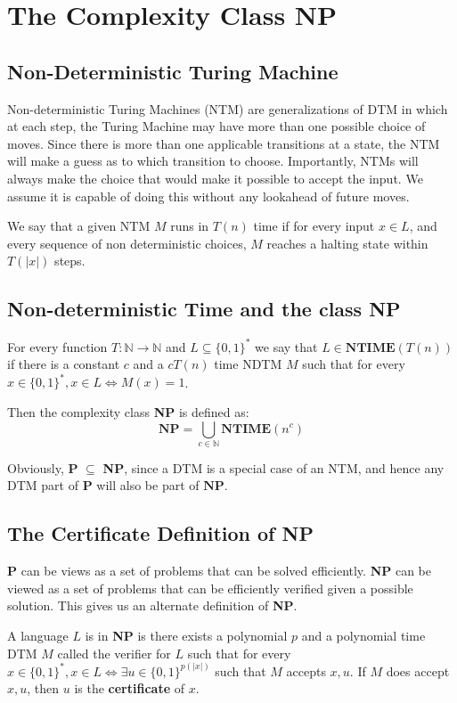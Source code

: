 \documentclass[12pt,letterpaper]{article}
\theoremstyle{definition}
\newcommand{\N}{\mathbb{N}}
\begin{document}
\section{The Complexity Class NP}

\subsection{Non-Deterministic Turing Machine}

Non-deterministic Turing Machines (NTM) are generalizations of DTM in which at each step, the Turing Machine may have more than one possible choice of moves. Since there is more than one applicable transitions at a state, the NTM will make a guess as to which transition to choose. Importantly, NTMs will always make the choice that would make it possible to accept the input. We assume it is capable of doing this without any lookahead of future moves.

We say that a given NTM $M$ runs in $T(n)$ time if for every input $x \in L$,  and every sequence of non deterministic choices, $M$ reaches a halting state within $T(|x|)$ steps.

\subsection{Non-deterministic Time and the class NP}

For every function $T : \N \rightarrow \N$ and $L \subseteq \{0,1\}^*$ we say that $L \in \mathbf{NTIME}(T(n))$ if there is a constant $c$ and a $cT(n)$ time NDTM $M$ such that for every $x \in \{0,1\}^*, x \in L \Leftrightarrow M(x) = 1$.

Then the complexity class \textbf{NP} is defined as:
\[\mathbf{NP} = \bigcup_{c \in \N} \mathbf{NTIME}(n^c)\]

Obviously, \textbf{P} $\subseteq$ \textbf{NP}, since a DTM is a special case of an NTM, and hence any DTM part of $\mathbf{P}$ will also be part of $\mathbf{NP}$.

\subsection{The Certificate Definition of NP}
\textbf{P} can be views as a set of problems that can be solved efficiently. \textbf{NP} can be viewed as a set of problems that can be efficiently verified given a possible solution. This gives us an alternate definition of \textbf{NP}.

A language $L$ is in \textbf{NP} is there exists a polynomial $p$ and a polynomial time DTM $M$ called the verifier for $L$ such that for every $x \in \{0,1\}^*, x \in L \Leftrightarrow \exists u \in \{0,1\}^{p(|x|)}$ such that $M$ accepts $x,u$. If $M$ does accept $x,u$, then $u$ is the \textbf{certificate} of $x$. 
\end{document}
